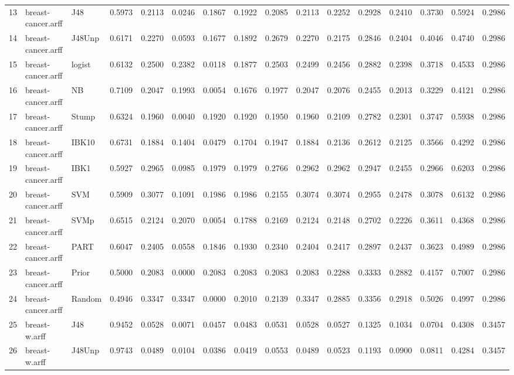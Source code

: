 \documentclass {article}
\begin{document}
\begin{table}[ht]
\begin{tabular}{rllrrrrrrrrrrrrr}
  13 & breast-cancer.arff & J48 & 0.5973 & 0.2113 & 0.0246 & 0.1867 & 0.1922 & 0.2085 & 0.2113 & 0.2252 & 0.2928 & 0.2410 & 0.3730 & 0.5924 & 0.2986 \\ 
  14 & breast-cancer.arff & J48Unp & 0.6171 & 0.2270 & 0.0593 & 0.1677 & 0.1892 & 0.2679 & 0.2270 & 0.2175 & 0.2846 & 0.2404 & 0.4046 & 0.4740 & 0.2986 \\ 
  15 & breast-cancer.arff & logist & 0.6132 & 0.2500 & 0.2382 & 0.0118 & 0.1877 & 0.2503 & 0.2499 & 0.2456 & 0.2882 & 0.2398 & 0.3718 & 0.4533 & 0.2986 \\ 
  16 & breast-cancer.arff & NB & 0.7109 & 0.2047 & 0.1993 & 0.0054 & 0.1676 & 0.1977 & 0.2047 & 0.2076 & 0.2455 & 0.2013 & 0.3229 & 0.4121 & 0.2986 \\ 
  17 & breast-cancer.arff & Stump & 0.6324 & 0.1960 & 0.0040 & 0.1920 & 0.1920 & 0.1950 & 0.1960 & 0.2109 & 0.2782 & 0.2301 & 0.3747 & 0.5938 & 0.2986 \\ 
  18 & breast-cancer.arff & IBK10 & 0.6731 & 0.1884 & 0.1404 & 0.0479 & 0.1704 & 0.1947 & 0.1884 & 0.2136 & 0.2612 & 0.2125 & 0.3566 & 0.4292 & 0.2986 \\ 
  19 & breast-cancer.arff & IBK1 & 0.5927 & 0.2965 & 0.0985 & 0.1979 & 0.1979 & 0.2766 & 0.2962 & 0.2962 & 0.2947 & 0.2455 & 0.2966 & 0.6203 & 0.2986 \\ 
  20 & breast-cancer.arff & SVM & 0.5909 & 0.3077 & 0.1091 & 0.1986 & 0.1986 & 0.2155 & 0.3074 & 0.3074 & 0.2955 & 0.2478 & 0.3078 & 0.6132 & 0.2986 \\ 
  21 & breast-cancer.arff & SVMp & 0.6515 & 0.2124 & 0.2070 & 0.0054 & 0.1788 & 0.2169 & 0.2124 & 0.2148 & 0.2702 & 0.2226 & 0.3611 & 0.4368 & 0.2986 \\ 
  22 & breast-cancer.arff & PART & 0.6047 & 0.2405 & 0.0558 & 0.1846 & 0.1930 & 0.2340 & 0.2404 & 0.2417 & 0.2897 & 0.2437 & 0.3623 & 0.4989 & 0.2986 \\ 
  23 & breast-cancer.arff & Prior & 0.5000 & 0.2083 & 0.0000 & 0.2083 & 0.2083 & 0.2083 & 0.2083 & 0.2288 & 0.3333 & 0.2882 & 0.4157 & 0.7007 & 0.2986 \\ 
  24 & breast-cancer.arff & Random & 0.4946 & 0.3347 & 0.3347 & 0.0000 & 0.2010 & 0.2139 & 0.3347 & 0.2885 & 0.3356 & 0.2918 & 0.5026 & 0.4997 & 0.2986 \\ 
  25 & breast-w.arff & J48 & 0.9452 & 0.0528 & 0.0071 & 0.0457 & 0.0483 & 0.0531 & 0.0528 & 0.0527 & 0.1325 & 0.1034 & 0.0704 & 0.4308 & 0.3457 \\ 
  26 & breast-w.arff & J48Unp & 0.9743 & 0.0489 & 0.0104 & 0.0386 & 0.0419 & 0.0553 & 0.0489 & 0.0523 & 0.1193 & 0.0900 & 0.0811 & 0.4284 & 0.3457 \\ 

\end{tabular}
\end{table}
\end{document}
